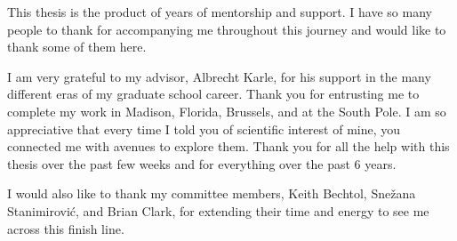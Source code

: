 This thesis is the product of years of mentorship and support. I have so many people to thank for accompanying me throughout this journey and would like to thank some of them here. 

I am very grateful to my advisor, Albrecht Karle, for his support in the many different eras of my graduate school career. 
Thank you for entrusting me to complete my work in Madison, Florida, Brussels, and at the South Pole. 
I am so appreciative that every time I told you of scientific interest of mine, you connected me with avenues to explore them.
Thank you for all the help with this thesis over the past few weeks and for everything over the past 6 years. 

I would also like to thank my committee members, Keith Bechtol, Snežana Stanimirović, and Brian Clark, for extending their time and energy to see me across this finish line.

